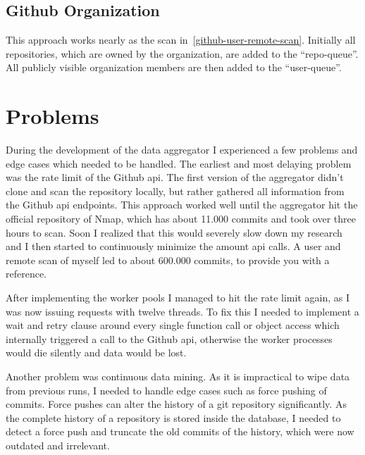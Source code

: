 \subsection{Github Organization}
This approach works nearly as the scan in~\ref{github-user-remote-scan}.
Initially all repositories, which are owned by the organization, are added to the ``repo-queue''.
All publicly visible organization members are then added to the ``user-queue''.


\section{Problems}
During the development of the data aggregator I experienced a few problems and edge cases which needed to be handled.
The earliest and most delaying problem was the rate limit of the Github \ac{api}.
The first version of the aggregator didn't clone and scan the repository locally, but rather gathered all information from the Github \ac{api} endpoints.
This approach worked well until the aggregator hit the official repository of Nmap, which has about 11.000 commits and took over three hours to scan.
Soon I realized that this would severely slow down my research and I then started to continuously minimize the amount \ac{api} calls.
A user and remote scan of myself led to about 600.000 commits, to provide you with a reference.

After implementing the worker pools I managed to hit the rate limit again, as I was now issuing requests with twelve threads.
To fix this I needed to implement a wait and retry clause around every single function call or object access which internally triggered a call to the Github \ac{api}, otherwise the worker processes would die silently and data would be lost.

Another problem was continuous data mining.
As it is impractical to wipe data from previous runs, I needed to handle edge cases such as force pushing of commits.
Force pushes can alter the history of a git repository significantly.
As the complete history of a repository is stored inside the database, I needed to detect a force push and truncate the old commits of the history, which were now outdated and irrelevant.
